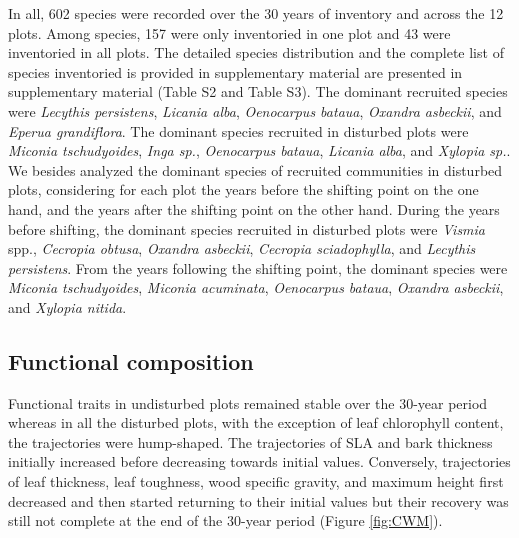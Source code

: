 \documentclass[fleqn,10pt]{ArtEcoFoG} %
\begin{document}
In all, 602 species were recorded over the 30 years of inventory and across the 12 plots. Among species, 157 were only inventoried in one plot and 43 were inventoried in all plots.
The detailed species distribution and the complete list of species inventoried is provided in supplementary material are presented in supplementary material (Table S2 and Table S3). The dominant recruited species were \emph{Lecythis persistens}, \emph{Licania alba}, \emph{Oenocarpus bataua}, \emph{Oxandra asbeckii}, and \emph{Eperua grandiflora}.
The dominant species recruited in disturbed plots were \emph{Miconia tschudyoides}, \emph{Inga sp.}, \emph{Oenocarpus bataua}, \emph{Licania alba}, and \emph{Xylopia sp.}.
We besides analyzed the dominant species of recruited communities in disturbed plots, considering for each plot the years before the shifting point on the one hand, and the years after the shifting point on the other hand.
During the years before shifting, the dominant species recruited in disturbed plots were \emph{Vismia} spp., \emph{Cecropia obtusa}, \emph{Oxandra asbeckii}, \emph{Cecropia sciadophylla}, and \emph{Lecythis persistens}. From the years following the shifting point, the dominant species were \emph{Miconia tschudyoides}, \emph{Miconia acuminata}, \emph{Oenocarpus bataua}, \emph{Oxandra asbeckii}, and \emph{Xylopia nitida}.

\hypertarget{functional-composition}{%
\subsection{Functional composition}\label{functional-composition}}

Functional traits in undisturbed plots remained stable over the 30-year period whereas in all the disturbed plots, with the exception of leaf chlorophyll content, the trajectories were hump-shaped. The trajectories of SLA and bark thickness initially increased before decreasing towards initial values. Conversely, trajectories of leaf thickness, leaf toughness, wood specific gravity, and maximum height first decreased and then started returning to their initial values but their recovery was still not complete at the end of the 30-year period (Figure \ref{fig:CWM}).
\end{document}
